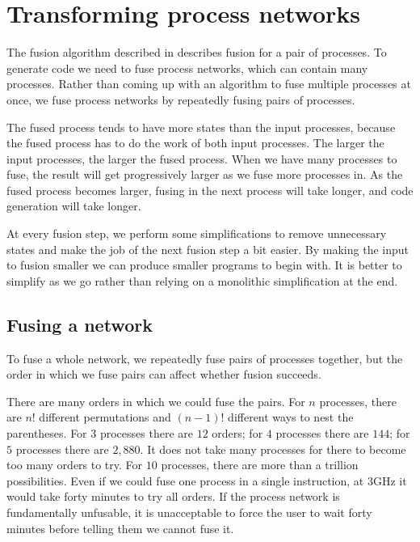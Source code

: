\section{Transforming process networks}
\label{s:Optimisation}

The fusion algorithm described in  describes fusion for a pair of processes.
To generate code we need to fuse process networks, which can contain many processes.
Rather than coming up with an algorithm to fuse multiple processes at once, we fuse process networks by repeatedly fusing pairs of processes.

The fused process tends to have more states than the input processes, because the fused process has to do the work of both input processes.
The larger the input processes, the larger the fused process.
When we have many processes to fuse, the result will get progressively larger as we fuse more processes in.
As the fused process becomes larger, fusing in the next process will take longer, and code generation will take longer.


At every fusion step, we perform some simplifications to remove unnecessary states and make the job of the next fusion step a bit easier.
By making the input to fusion smaller we can produce smaller programs to begin with.
It is better to simplify as we go rather than relying on a monolithic simplification at the end.

\subsection{Fusing a network}
To fuse a whole network, we repeatedly fuse pairs of processes together, but the order in which we fuse pairs can affect whether fusion succeeds.


There are many orders in which we could fuse the pairs.
For $n$ processes, there are $n!$ different permutations and $(n-1)!$ different ways to nest the parentheses.
For $3$ processes there are $12$ orders; for $4$ processes there are $144$; for $5$ processes there are $2,880$.
It does not take many processes for there to become too many orders to try.
For $10$ processes, there are more than a trillion possibilities.
Even if we could fuse one process in a single instruction, at 3GHz it would take forty minutes to try all orders.
If the process network is fundamentally unfusable, it is unacceptable to force the user to wait forty minutes before telling them we cannot fuse it.

